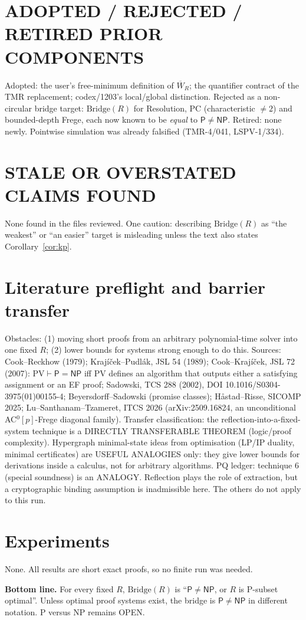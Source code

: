 \documentclass[11pt]{article}
\theoremstyle{definition}
\newcommand{\Wbar}{\overline{W}}
\newcommand{\Pc}{\mathsf{P}}
\newcommand{\NP}{\mathsf{NP}}
\newcommand{\Bridge}{\mathrm{Bridge}}
\begin{document}
\section*{ADOPTED / REJECTED / RETIRED PRIOR COMPONENTS}
Adopted: the user's free-minimum definition of $\Wbar_R$; the quantifier
contract of the TMR replacement; codex/1203's local/global distinction.
Rejected as a non-circular bridge target: $\Bridge(R)$ for Resolution, PC
(characteristic $\ne2$) and bounded-depth Frege, each now known to be
\emph{equal} to $\Pc\ne\NP$.
Retired: none newly. Pointwise simulation was already falsified (TMR-4/041,
LSPV-1/334).

\section*{STALE OR OVERSTATED CLAIMS FOUND}
None found in the files reviewed. One caution: describing $\Bridge(R)$ as
``the weakest'' or ``an easier'' target is misleading unless the text also
states Corollary~\ref{cor:kp}.

\section*{Literature preflight and barrier transfer}
Obstacles: (1) moving short proofs from an arbitrary polynomial-time solver
into one fixed $R$; (2) lower bounds for systems strong enough to do this.
Sources: Cook--Reckhow (1979); Krajíček--Pudlák, JSL 54 (1989); Cook--Krajíček,
JSL 72 (2007): $\mathrm{PV}\vdash\Pc=\NP$ iff PV defines an algorithm that
outputs either a satisfying assignment or an EF proof; Sadowski, TCS 288 (2002),
DOI 10.1016/S0304-3975(01)00155-4; Beyersdorff--Sadowski (promise classes);
Håstad--Risse, SICOMP 2025; Lu--Santhanam--Tzameret, ITCS 2026
(arXiv:2509.16824, an unconditional AC$^0[p]$-Frege diagonal family).
Transfer classification: the reflection-into-a-fixed-system technique is a
DIRECTLY TRANSFERABLE THEOREM (logic/proof complexity). Hypergraph
minimal-state ideas from optimisation (LP/IP duality, minimal certificates)
are USEFUL ANALOGIES only: they give lower bounds for derivations inside a
calculus, not for arbitrary algorithms.
PQ ledger: technique 6 (special soundness) is an ANALOGY. Reflection plays the
role of extraction, but a cryptographic binding assumption is inadmissible
here. The others do not apply to this run.

\section*{Experiments}
None. All results are short exact proofs, so no finite run was needed.

\medskip\noindent\textbf{Bottom line.}
For every fixed $R$, $\Bridge(R)$ is ``$\Pc\ne\NP$, or $R$ is P-subset
optimal''. Unless optimal proof systems exist, the bridge is $\Pc\ne\NP$ in
different notation. P versus NP remains OPEN.
\end{document}
